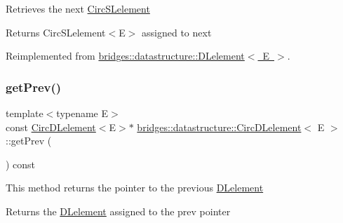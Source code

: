 Retrieves the next \mbox{\hyperlink{classbridges_1_1datastructure_1_1_circ_s_lelement}{Circ\+S\+Lelement}} \begin{DoxyReturn}{Returns}
Circ\+S\+Lelement$<$\+E$>$ assigned to next 
\end{DoxyReturn}


Reimplemented from \mbox{\hyperlink{classbridges_1_1datastructure_1_1_d_lelement_a63212051ea77d74bd751dea00288d2be}{bridges\+::datastructure\+::\+D\+Lelement$<$ E $>$}}.

\mbox{\label{classbridges_1_1datastructure_1_1_circ_d_lelement_a7176c3ca8347d8d9324a86265c7d6f84}} 
\subsubsection{\texorpdfstring{getPrev()}{getPrev()}}
{\footnotesize\ttfamily template$<$typename E$>$ \\
const \mbox{\hyperlink{classbridges_1_1datastructure_1_1_circ_d_lelement}{Circ\+D\+Lelement}}$<$E$>$$\ast$ \mbox{\hyperlink{classbridges_1_1datastructure_1_1_circ_d_lelement}{bridges\+::datastructure\+::\+Circ\+D\+Lelement}}$<$ E $>$\+::get\+Prev (\begin{DoxyParamCaption}{ }\end{DoxyParamCaption}) const\hspace{0.3cm}{\ttfamily [inline]}}

This method returns the pointer to the previous \mbox{\hyperlink{classbridges_1_1datastructure_1_1_d_lelement}{D\+Lelement}} \begin{DoxyReturn}{Returns}
the \mbox{\hyperlink{classbridges_1_1datastructure_1_1_d_lelement}{D\+Lelement}} assigned to the prev pointer 
\end{DoxyReturn}
\mbox{\label{classbridges_1_1datastructure_1_1_circ_d_lelement_aa19f430c7b00a6d38187021255f741e4}} 
